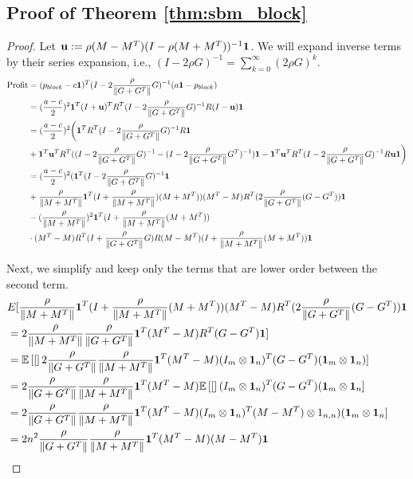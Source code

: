 \subsection{Proof of Theorem \ref{thm:sbm_block}}
\begin{proof}
    Let $\mathbf{u} := \rho (M-M^T) (I - \rho (M+M^T))^{-1} \mathbf{1}$. We will expand inverse terms by their series expansion, i.e., $(I-2\rho G)^{-1} = \sum_{k=0}^\infty (2\rho G)^k$. 
\begin{align*}
    \text{Profit} &= (p_{block} - c\mathbf{1})^T (I - 2\frac{\rho}{\|G+G^T\|} G)^{-1} (a\mathbf{1} - p_{block}) \\ 
    &= (\frac{a-c}{2})^2 \mathbf{1}^T (I+\mathbf{u})^T R^T (I - 2\frac{\rho}{\|G+G^T\|} G)^{-1} R(I-\mathbf{u}) \mathbf{1} \\ 
    &= (\frac{a-c}{2})^2 \biggl( \mathbf{1}^T R^T (I - 2\frac{\rho}{\|G+G^T\|} G)^{-1} R \mathbf{1} \\
    &+ \mathbf{1}^T \mathbf{u}^T R^T ((I - 2\frac{\rho}{\|G+G^T\|} G)^{-1}-(I - 2\frac{\rho}{\|G+G^T\|} G^T)^{-1}) \mathbf{1} - \mathbf{1}^T \mathbf{u}^T  R^T (I - 2\frac{\rho}{\|G+G^T\|} G)^{-1} R \mathbf{u} \mathbf{1} \biggr) \\ 
    &= (\frac{a-c}{2})^2 ( \mathbf{1}^T (I - 2\frac{\rho}{\|G+G^T\|} G)^{-1} \mathbf{1} \\
    &+ \frac{\rho}{\|M+M^T\|} \mathbf{1}^T (I + \frac{\rho}{\|M+M^T\|} )(M+M^T))(M^T-M)R^T (2\frac{\rho}{\|G+G^T\|} (G-G^T)) \mathbf{1} \\
    &- (\frac{\rho}{\|M+M^T\|})^2 \mathbf{1}^T (I+ \frac{\rho}{\|M+M^T\|} (M+M^T))\\
    &\cdot (M^T - M) R^T (I + \frac{\rho}{\|G+G^T\|} G) R (M-M^T) (I+\frac{\rho}{\|M+M^T\|} (M+M^T))\mathbf{1} 
\end{align*}

Next, we simplify and keep only the terms that are lower order between the second term. 
\begin{align*}
   &E[\frac{\rho}{\|M+M^T\|} \mathbf{1}^T (I + \frac{\rho}{\|M+M^T\|} (M+M^T))(M^T-M)R^T (2\frac{\rho}{\|G+G^T\|} (G-G^T)) \mathbf{1}\\
   &= 2\frac{\rho}{\|M+M^T\|} \frac{\rho}{\|G+G^T\|}  \mathbf{1}^T (M^T-M) R^T (G-G^T) \mathbf{1}] \\
   &= \mathbb{E}\left[ [\right]2\frac{\rho}{\|G+G^T\|} \frac{\rho}{\|M+M^T\|} \mathbf{1}^T (M^T-M) (I_m \otimes \mathbf{1}_n)^T  (G-G^T) (\mathbf{1}_m \otimes \mathbf{1}_n)] \\
   &= 2\frac{\rho}{\|G+G^T\|} \frac{\rho}{\|M+M^T\|} \mathbf{1}^T (M^T-M) \mathbb{E}\left[ [\right](I_m \otimes \mathbf{1}_n)^T  (G-G^T) (\mathbf{1}_m \otimes \mathbf{1}_n] \\
   &= 2\frac{\rho}{\|G+G^T\|} \frac{\rho}{\|M+M^T\|} \mathbf{1}^T (M^T-M) (I_m \otimes \mathbf{1}_n)^T  (M-M^T)\otimes 1_{n,n}) (\mathbf{1}_m \otimes \mathbf{1}_n] \\
   &= 2 n^2 \frac{\rho}{\|G+G^T\|} \frac{\rho}{\|M+M^T\|} \mathbf{1}^T (M^T - M) (M-M^T) \mathbf{1} \\
\end{align*}


\end{proof}
